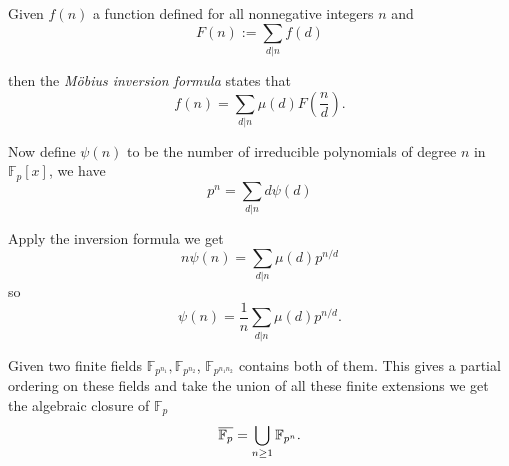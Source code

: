 \documentclass[a4paper]{article}
\begin{document}
Given $f(n)$ a function defined for all nonnegative integers $n$ and
\[
  F(n) := \sum_{d|n} f(d)
\]

then the \emph{M\"obius inversion formula} states that
\[
  f(n) = \sum_{d|n} \mu(d) F(\frac{n}{d}).
\]

Now define $\psi(n)$ to be the number of irreducible polynomials of degree $n$ in $\mathbb F_p[x]$, we have
\[
  p^n = \sum_{d|n} d\psi(d)
\]

Apply the inversion formula we get
\[
  n \psi(n) = \sum_{d|n} \mu(d) p^{n/d}
\]
so
\[
  \psi(n) = \frac{1}{n} \sum_{d|n} \mu(d) p^{n/d}.
\]

Given two finite fields $\mathbb F_{p^{n_1}}, \mathbb F_{p^{n_2}}$, $\mathbb F_{p^{n_1n_2}}$ contains both of them. This gives a partial ordering on these fields and take the union of all these finite extensions we get the algebraic closure of $\mathbb F_p$
\[
  \cl{\mathbb F_p} = \bigcup_{n\geq 1} \mathbb F_{p^n}.
\]

\iffalse
\appendix

\section{From Dexter Chua Notes}

\begin{lemma}
  Given $L/K$, $f(t) \in K[t]$ irreducible, there is a bijection between
  \[ \{ \text{roots of } f \: \text{in } L \} \longleftrightarrow \Hom_K(K[t]/(f(t)), L) \]
\end{lemma}
\fi
\end{document}
